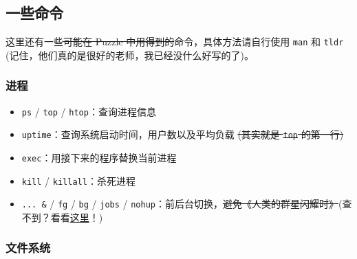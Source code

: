 \documentclass{article}
\begin{document}
	\subsection{一些命令}

	这里还有一些\sout{可能在 Puzzle 中用得到的}命令，具体方法请自行使用 \texttt{man} 和 \texttt{tldr} (记住，他们真的是很好的老师，我已经没什么好写的了)。

	\subsubsection{进程}

	\begin{itemize}
		\itemsep0pt
		\item \texttt{ps} / \texttt{top} / \texttt{htop}：查询进程信息
		\item \texttt{uptime}：查询系统启动时间，用户数以及平均负载 \sout{(其实就是 \texttt{top} 的第一行)}
		\item \texttt{exec}：用接下来的程序替换当前进程
		\item \texttt{kill} / \texttt{killall}：杀死进程
		\item \texttt{... \&} / \texttt{fg} / \texttt{bg} / \texttt{jobs} / \texttt{nohup}：前后台切换，\sout{避免《人类的群星闪耀时》}(查不到？看看\hyperref[item:docbuiltin]{这里}！)
	\end{itemize}

	\subsubsection{文件系统}
\end{document}
